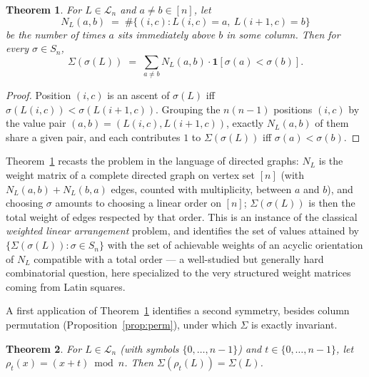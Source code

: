 \documentclass[11pt]{amsart}
\newtheorem{theorem}{Theorem}[section]
\begin{document}
\begin{theorem}\label{thm:symbol-general}
For $L\in\mathcal L_n$ and $a\ne b\in[n]$, let
\[
N_L(a,b) \;=\; \#\{(i,c) : L(i,c)=a,\ L(i+1,c)=b\}
\]
be the number of times $a$ sits immediately above $b$ in some column. Then for every $\sigma\in S_n$,
\[
\Sigma(\sigma(L)) \;=\; \sum_{a\ne b} N_L(a,b)\cdot\mathbf{1}[\sigma(a)<\sigma(b)] .
\]
\end{theorem}

\begin{proof}
Position $(i,c)$ is an ascent of $\sigma(L)$ iff $\sigma(L(i,c))<\sigma(L(i+1,c))$. Grouping the $n(n-1)$ positions $(i,c)$ by the value pair $(a,b)=(L(i,c),L(i+1,c))$, exactly $N_L(a,b)$ of them share a given pair, and each contributes $1$ to $\Sigma(\sigma(L))$ iff $\sigma(a)<\sigma(b)$.
\end{proof}

Theorem~\ref{thm:symbol-general} recasts the problem in the language of directed graphs: $N_L$ is the weight matrix of a complete directed graph on vertex set $[n]$ (with $N_L(a,b)+N_L(b,a)$ edges, counted with multiplicity, between $a$ and $b$), and choosing $\sigma$ amounts to choosing a linear order on $[n]$; $\Sigma(\sigma(L))$ is then the total weight of edges respected by that order. This is an instance of the classical \emph{weighted linear arrangement} problem, and identifies the set of values attained by $\{\Sigma(\sigma(L)):\sigma\in S_n\}$ with the set of achievable weights of an acyclic orientation of $N_L$ compatible with a total order --- a well-studied but generally hard combinatorial question, here specialized to the very structured weight matrices coming from Latin squares.

A first application of Theorem~\ref{thm:symbol-general} identifies a second symmetry, besides column permutation (Proposition~\ref{prop:perm}), under which $\Sigma$ is exactly invariant.

\begin{theorem}\label{thm:shift-invariance}
For $L\in\mathcal L_n$ (with symbols $\{0,\dots,n-1\}$) and $t\in\{0,\dots,n-1\}$, let $\rho_t(x)=(x+t)\bmod n$. Then $\Sigma(\rho_t(L))=\Sigma(L)$.
\end{theorem}
\end{document}
